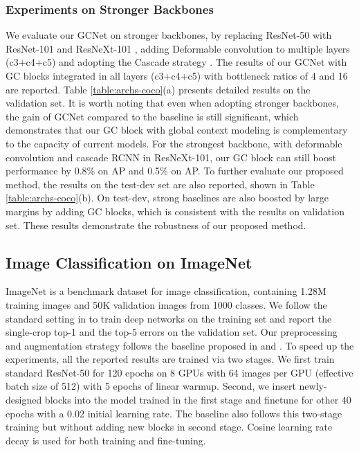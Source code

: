 \documentclass[10pt,twocolumn,letterpaper]{article}
\begin{document}
\subsubsection{Experiments on Stronger Backbones}
We evaluate our GCNet on stronger backbones, by replacing ResNet-50 with ResNet-101 and ResNeXt-101 \cite{xie2017resnext}, adding Deformable convolution to multiple layers (c3+c4+c5) \cite{dai2017dcnv1,zhu2018dcnv2} and adopting the Cascade strategy \cite{cai2018cascade}.
The results of our GCNet with GC blocks integrated in all layers (c3+c4+c5) with bottleneck ratios of 4 and 16 are reported.
Table \ref{table:archs-coco}(a) presents detailed results on the validation set.
It is worth noting that even when adopting stronger backbones, the gain of GCNet compared to the baseline is still significant, which demonstrates that our GC block with global context modeling is complementary to the capacity of current models.
For the strongest backbone, with deformable convolution and cascade RCNN in ResNeXt-101, our GC block can still boost performance by 0.8\% on AP and 0.5\% on AP.
To further evaluate our proposed method, the results on the test-dev set are also reported, shown in Table \ref{table:archs-coco}(b). 
On test-dev, strong baselines are also boosted by large margins by adding GC blocks, which is consistent with the results on validation set. 
These results demonstrate the robustness of our proposed method. 



\subsection{Image Classification on ImageNet}
ImageNet \cite{deng2009imagenet} is a benchmark dataset for image classification, containing 1.28M training images and 50K validation images from 1000 classes. We follow the standard setting in \cite{he2015resnet} to train deep networks on the training set and report the single-crop top-1 and the top-5 errors on the validation set.
Our preprocessing and augmentation strategy follows the baseline proposed in \cite{xie2018bag} and \cite{hu2018senet}.
To speed up the experiments, all the reported results are trained via two stages.
We first train standard ResNet-50 for 120 epochs on 8 GPUs with 64 images per GPU (effective batch size of 512) with 5 epochs of linear warmup. Second, we insert newly-designed blocks into the model trained in the first stage and finetune for other 40 epochs with a 0.02 initial learning rate. The baseline also follows this two-stage training but without adding new blocks in second stage. Cosine learning rate decay is used for both training and fine-tuning. 
\end{document}
